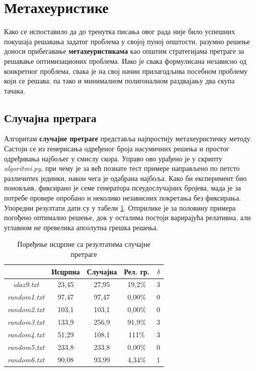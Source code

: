 \documentclass[a4paper]{article}
\begin{document}
\section{Метахеуристике}

Како се испоставило да до тренутка писања овог рада није било успешних покушаја решавања задатог проблема у својој пуној општости, разумно решење доноси прибегавање \textbf{метахеуристикама} као општим стратегијама претраге за решавање оптимизационих проблема. Иако је свака формулисана независно од конкретног проблема, свака је на свој начин прилагодљива посебном проблему који се решава, па тако и минималном полигоналном раздвајању два скупа тачака.

\subsection{Случајна претрага}

Алгоритам \textbf{случајне претраге} представља најпростију метахеуристичку методу. Састоји се из генерисања одређеног броја насумичних решења и простог одређивања најбољег у смислу скора. Управо ово урађено је у скрипту \textit{algoritmi.py}, при чему је за већ познате тест примере направљено по петсто различитих јединки, након чега је одабрана најбоља. Како би експеримент био поновљив, фиксирано је семе генератора псеудослучајних бројева, мада је за потребе провере опробано и неколико независних покретања без фиксирања. Упоредни резултати дати су у табели \ref{slucajna}. Отприлике је за половину примера погођено оптимално решење, док у осталима постоји варирајућа релативна, али углавном не превелика апсолутна грешка решења.

\begin{table}[h!]
\begin{center}
\caption{Поређење исцрпне са резултатима случајне претраге}
\begin{tabular}{| c | c c | c c |} \hline
& Исцрпна & Случајна & Рел. гр. & $\delta$\\ \hline
\textit{ulaz9.txt} & 23,45 &  27,95 & 19,2\% & 3\\
\textit{random1.txt} & 97,47 &  97,47 & 0,00\% & 0\\
\textit{random2.txt} & 103,1 &  103,1 & 0,00\% & 0\\
\textit{random3.txt} & 133,9 & 256,9 & 91,9\% & 3\\
\textit{random4.txt} & 51,29 & 108,1 & 111\% & 3\\
\textit{random5.txt} & 233,8 & 233,8 & 0,00\% & 0\\
\textit{random6.txt} & 90,08 & 93,99 & 4,34\% & 1\\ \hline
\end{tabular}
\label{slucajna}
\end{center}
\end{table}
\end{document}
